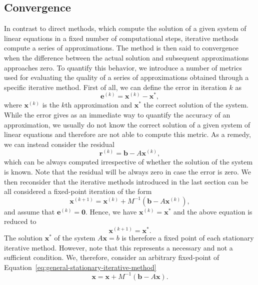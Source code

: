 \subsection{Convergence}
In contrast to direct methods, which compute the solution of a given system of linear equations in a fixed number of computational steps, iterative methods compute a series of approximations.
The method is then said to convergence when the difference between the actual solution and subsequent approximations approaches zero.
To quantify this behavior, we introduce a number of metrics used for evaluating the quality of a series of approximations obtained through a specific iterative method.
First of all, we can define the error in iteration $k$ as
\begin{equation*}
	\bm{e}^{(k)} = \bm{x}^{(k)} - \bm{x}^{*},
\end{equation*}
where $\bm{x}^{(k)}$ is the $k$th approximation and $\bm{x}^{*}$ the correct solution of the system.
While the error gives as an immediate way to quantify the accuracy of an approximation, we usually do not know the correct solution of a given system of linear equations and therefore are not able to compute this metric.
As a remedy, we can instead consider the residual
\begin{equation*}
	\bm{r}^{(k)} = \bm{b} - A \bm{x}^{(k)},
\end{equation*}
which can be always computed irrespective of whether the solution of the system is known.
Note that the residual will be always zero in case the error is zero.
We then reconsider that the iterative methods introduced in the last section can be all considered a fixed-point iteration of the form
\begin{equation}
	\bm{x}^{(k+1)} = \bm{x}^{(k)} + M^{-1}(\bm b - A \bm{x}^{(k)}),
\end{equation}
and assume that $\bm{e}^{(k)} = \bm{0}$.
Hence, we have $\bm{x}^{(k)} = \bm{x}^{*}$ and the above equation is reduced to
\begin{equation}
	\bm{x}^{(k+1)} = \bm{x}^{*}.
\end{equation}
The solution $\bm{x}^{*}$ of the system $A \bm{x} = b$ is therefore a fixed point of each stationary iterative method.
However, note that this represents a necessary and not a sufficient condition. 
We, therefore, consider an arbitrary fixed-point of Equation~\eqref{eq:general-stationary-iterative-method}
\begin{equation*}
	\bm{x} = \bm{x} + M^{-1}(\bm b - A \bm{x}).
\end{equation*}
